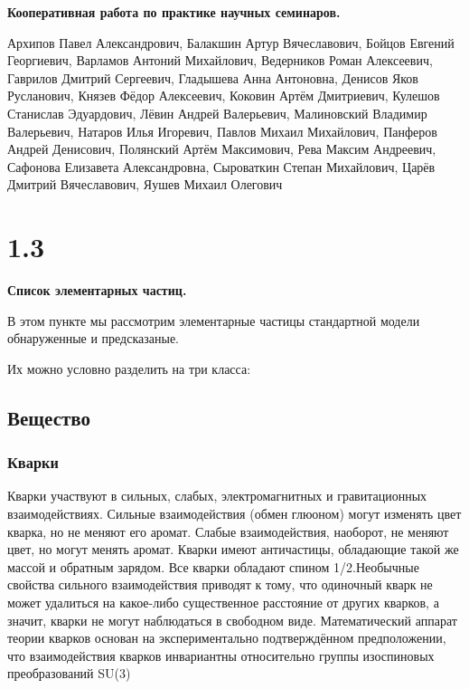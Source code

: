 \documentclass[a4paper,14pt]{article}
\begin{document}
\begin{center}
	\LARGE{\textbf{Кооперативная работа по практике научных семинаров.}}
\end{center}

\begin{center}
	\normalsize{Архипов Павел Александрович, Балакшин Артур Вячеславович, Бойцов Евгений Георгиевич, Варламов Антоний Михайлович, Ведерников Роман Алексеевич, Гаврилов Дмитрий Сергеевич, Гладышева Анна Антоновна, Денисов Яков Русланович, Князев Фёдор Алексеевич, Коковин Артём Дмитриевич, Кулешов Станислав Эдуардович, Лёвин Андрей Валерьевич, Малиновский Владимир Валерьевич, Натаров Илья Игоревич, Павлов Михаил Михайлович, Панферов Андрей Денисович, Полянский Артём Максимович, Рева Максим Андреевич, Сафонова Елизавета Александровна, Сыроваткин Степан Михайлович, Царёв Дмитрий Вячеславович, Яушев Михаил Олегович}
\end{center}

\section*{1.3}
\begin{center}
	\LARGE{\textbf{Список элементарных частиц.}}
\end{center}


В этом пункте мы рассмотрим элементарные частицы стандартной модели обнаруженные и предсказаные.

Их можно условно разделить на три класса:

\subsection*{Вещество}

\subsubsection*{Кварки}

Кварки участвуют в сильных, слабых, электромагнитных и гравитационных взаимодействиях. Сильные взаимодействия (обмен глюоном) могут изменять цвет кварка, но не меняют его аромат. Слабые взаимодействия, наоборот, не меняют цвет, но могут менять аромат. Кварки имеют античастицы, обладающие такой же массой и обратным зарядом. Все кварки обладают спином 1/2.Необычные свойства сильного взаимодействия приводят к тому, что одиночный кварк не может удалиться на какое-либо существенное расстояние от других кварков, а значит, кварки не могут наблюдаться в свободном виде. Математический аппарат теории кварков основан на экспериментально подтверждённом предположении, что взаимодействия кварков инвариантны относительно группы изоспиновых преобразований SU(3)
\end{document}
